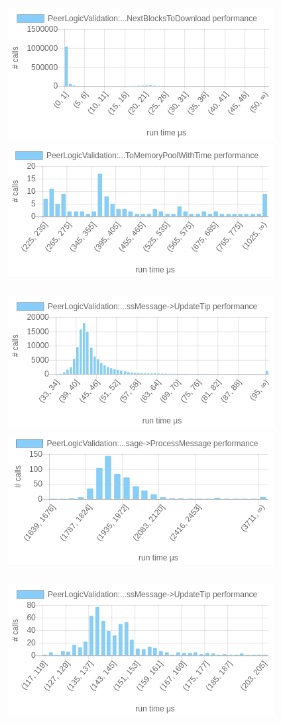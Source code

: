 \documentclass{article}
\begin{document}
\includegraphics[width=7cm]{images/london/chartPeerLogicValidation_3A_3ASendMessages-_3EFindNextBlocksToDownload.png}
\includegraphics[width=7cm]{images/london/chartPeerLogicValidation_3A_3AProcessMessages-_3EProcessMessage-_3EAcceptToMemoryPoolWithTime.png}

\includegraphics[width=7cm]{images/london/chartPeerLogicValidation_3A_3AProcessMessages-_3EProcessMessage-_3EUpdateTip.png}
\includegraphics[width=7cm]{images/london/chartPeerLogicValidation_3A_3AProcessMessages-_3EProcessMessage-_3EProcessMessage.png}

\includegraphics[width=7cm]{images/london/chartPeerLogicValidation_3A_3AProcessMessages-_3EProcessMessage-_3EProcessMessage-_3EUpdateTip.png}
\end{document}
